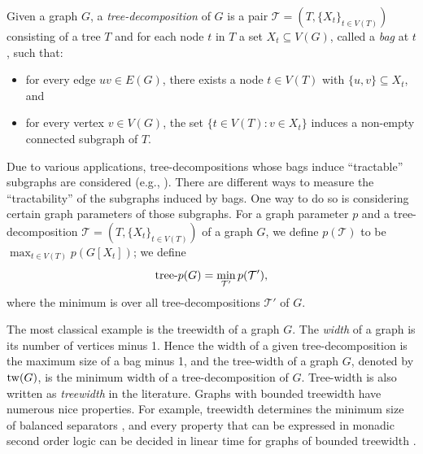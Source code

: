 \documentclass[a4paper, cleveref, autoref, thm-restate]{lipics-v2021}
\newcommand{\T}{\mathcal{T}}
\newcommand{\tw}{{\rm tw}}
\begin{document}
Given a graph $G$, a \emph{tree-decomposition} of $G$ is a pair $\T = (T,\{X_t\}_{t\in V(T)})$ consisting of a tree $T$ and for each node $t$ in $T$ a set $X_t \subseteq V(G)$, called a \emph{bag} at $t$, such that: %
\begin{itemize}
    \item for every edge $uv \in E(G)$, there exists a node $t \in V(T)$ with $\{u,v\} \subseteq X_t$, and
    \item for every vertex $v \in V(G)$, the set $\{t \in V(T): v \in X_t\}$ induces a non-empty connected subgraph of $T$. %
\end{itemize}

Due to various applications, tree-decompositions whose bags induce ``tractable'' subgraphs are considered (e.g., \cite{BBEGLPS-24,DMS-24,DVORAK2025103631,DM-18,Distel_2025,DOURISBOURE20072008,DK-14,Liu-25,LNW-24,ROBERTSON1986309,ROBERTSON200343,Sey-16,Yol-18}).
There are different ways to measure the ``tractability'' of the subgraphs induced by bags.
One way to do so is considering certain graph parameters of those subgraphs.
For a graph parameter $p$ and a tree-decomposition $\T = (T,\{X_t\}_{t\in V(T)})$ of a graph $G$, we define $p(\T)$ to be $\max_{t \in V(T)}p(G[X_t])$; we define $${\rm tree}\textnormal{-}p(G)=\min_{\T'}p(\T'),$$ where the minimum is over all tree-decompositions $\T'$ of $G$.

The most classical example is the treewidth of a graph $G$.
The \emph{width} of a graph is its number of vertices minus 1.
Hence the width of a given tree-decomposition is the maximum size of a bag minus 1, and the tree-width of a graph $G$, denoted by $\tw(G)$, is the minimum width of a tree-decomposition of $G$.
Tree-width is also written as \emph{treewidth} in the literature.
Graphs with bounded treewidth have numerous nice properties.
For example, treewidth determines the minimum size of balanced separators \cite{ROBERTSON1986309}, and every property that can be expressed in monadic second order logic can be decided in linear time for graphs of bounded treewidth \cite{COURCELLE199012}.
\end{document}

